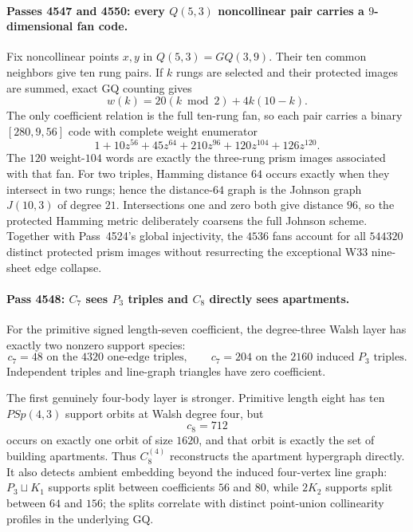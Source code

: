 \paragraph{Passes 4547 and 4550: every $Q(5,3)$ noncollinear pair carries a $9$-dimensional fan code.}
Fix noncollinear points $x,y$ in $Q(5,3)=GQ(3,9)$.  Their ten common neighbors
give ten rung pairs.  If $k$ rungs are selected and their protected images are
summed, exact GQ counting gives
\[
  \boxed{w(k)=20(k\bmod2)+4k(10-k).}
\]
The only coefficient relation is the full ten-rung fan, so each pair carries a
binary $[280,9,56]$ code with complete weight enumerator
\[
 \boxed{1+10z^{56}+45z^{64}+210z^{96}+120z^{104}+126z^{120}.}
\]
The $120$ weight-$104$ words are exactly the three-rung prism images associated
with that fan.  For two triples, Hamming distance $64$ occurs exactly when they
intersect in two rungs; hence the distance-$64$ graph is the Johnson graph
$J(10,3)$ of degree $21$.  Intersections one and zero both give distance $96$,
so the protected Hamming metric deliberately coarsens the full Johnson scheme.
Together with Pass~4524's global injectivity, the $4536$ fans account for all
$544320$ distinct protected prism images without resurrecting the exceptional
W33 nine-sheet edge collapse.

\paragraph{Pass 4548: $C_7$ sees $P_3$ triples and $C_8$ directly sees apartments.}
For the primitive signed length-seven coefficient, the degree-three Walsh layer
has exactly two nonzero support species:
\[
 \boxed{c_7=48\text{ on the }4320\text{ one-edge triples},\qquad
        c_7=204\text{ on the }2160\text{ induced }P_3\text{ triples}.}
\]
Independent triples and line-graph triangles have zero coefficient.

The first genuinely four-body layer is stronger.  Primitive length eight has ten
$PSp(4,3)$ support orbits at Walsh degree four, but
\[
 \boxed{c_8=712}
\]
occurs on exactly one orbit of size $1620$, and that orbit is exactly the set of
building apartments.  Thus $C_8^{(4)}$ reconstructs the apartment hypergraph
directly.  It also detects ambient embedding beyond the induced four-vertex line
graph: $P_3\sqcup K_1$ supports split between coefficients $56$ and $80$, while
$2K_2$ supports split between $64$ and $156$; the splits correlate with distinct
point-union collinearity profiles in the underlying GQ.

